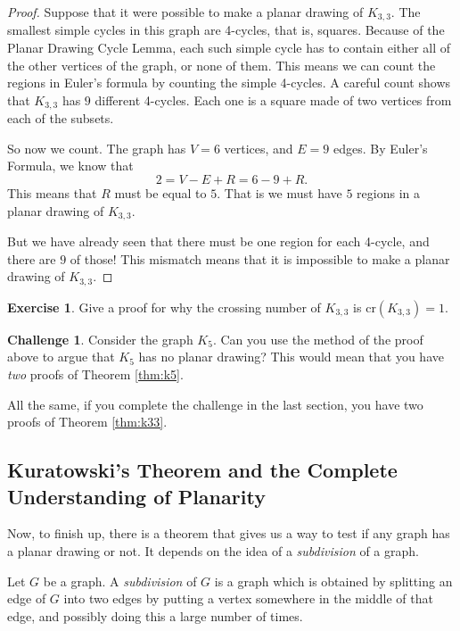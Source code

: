 \documentclass[12pt,letterpaper]{article}
\theoremstyle{definition}
\newtheorem{exercise}[question]{Exercise}
\newtheorem*{challenge}{Challenge}
\begin{document}
\begin{proof}
Suppose that it were possible to make a planar drawing of $K_{3,3}$. The smallest simple cycles in this graph
are 4-cycles, that is, squares. Because of the Planar Drawing Cycle Lemma, each such simple cycle has to contain either all of the other vertices of the graph, or none of them. This means we can count the regions in Euler's formula by counting the simple 4-cycles. A careful count shows that $K_{3,3}$ has $9$ different 4-cycles. Each one is a square made of two vertices from each of the subsets.

So now we count. The graph has $V=6$ vertices, and $E = 9$ edges. By Euler's Formula, we know that
\[
2 = V- E + R = 6 - 9 + R.
\]
This means that $R$ must be equal to $5$. That is we must have $5$ regions in a planar drawing of $K_{3,3}$.

But we have already seen that there must be one region for each 4-cycle, and there are $9$ of those! This mismatch
means that it is impossible to make a planar drawing of $K_{3,3}$.
\end{proof}

\begin{exercise}
Give a proof for why the crossing number of $K_{3,3}$ is $\mathrm{cr}(K_{3,3}) = 1$.
\end{exercise}


\begin{challenge}
Consider the graph $K_5$.  Can you use the method of the proof above to argue that $K_5$ has no planar drawing?
This would mean that you have \emph{two} proofs of Theorem \ref{thm:k5}.
\end{challenge}

All the same, if you complete the challenge in the last section, you have two proofs of Theorem \ref{thm:k33}.

\clearpage

\subsection*{Kuratowski's Theorem and the Complete Understanding of Planarity}

Now, to finish up, there is a theorem that gives us a way to test if any graph has a planar drawing or not. It depends on the idea of a \emph{subdivision} of a graph.

Let $G$ be a graph. A \emph{subdivision} of $G$ is a graph which is obtained by splitting an edge of $G$ into two edges by putting a vertex somewhere in the middle of that edge, and possibly doing this a large number of times.
\end{document}
